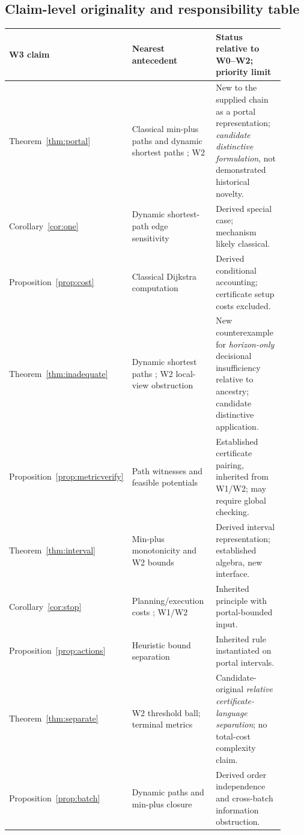 \documentclass[11pt,letterpaper]{article}
\begin{document}
\subsection*{Claim-level originality and responsibility table}
\small
\begin{longtable}{@{}p{0.22\linewidth}p{0.38\linewidth}p{0.31\linewidth}@{}}
\toprule
W3 claim & Nearest antecedent & Status relative to W0--W2; priority limit\\\midrule\endhead
Theorem~\ref{thm:portal} & Classical min-plus paths and dynamic shortest paths \cite{Mohri,Dynamic,Demetrescu}; W2 & New to the supplied chain as a portal representation; \emph{candidate distinctive formulation}, not demonstrated historical novelty.\\
Corollary~\ref{cor:one} & Dynamic shortest-path edge sensitivity \cite{Dynamic,Demetrescu} & Derived special case; mechanism likely classical.\\
Proposition~\ref{prop:cost} & Classical Dijkstra computation \cite{Dijkstra} & Derived conditional accounting; certificate setup costs excluded.\\
Theorem~\ref{thm:inadequate} & Dynamic shortest paths \cite{Dynamic}; W2 local-view obstruction & New counterexample for \emph{horizon-only} decisional insufficiency relative to ancestry; candidate distinctive application.\\
Proposition~\ref{prop:metricverify} & Path witnesses and feasible potentials \cite{Necula,Mugdan,W1} & Established certificate pairing, inherited from W1/W2; may require global checking.\\
Theorem~\ref{thm:interval} & Min-plus monotonicity \cite{Mohri} and W2 bounds & Derived interval representation; established algebra, new interface.\\
Corollary~\ref{cor:stop} & Planning/execution costs \cite{Shekhar,Russell}; W1/W2 & Inherited principle with portal-bounded input.\\
Proposition~\ref{prop:actions} & Heuristic bound separation \cite{Hart,W0,W2} & Inherited rule instantiated on portal intervals.\\
Theorem~\ref{thm:separate} & W2 threshold ball; terminal metrics \cite{Krauthgamer} & Candidate-original \emph{relative certificate-language separation}; no total-cost complexity claim.\\
Proposition~\ref{prop:batch} & Dynamic paths and min-plus closure \cite{Dynamic,Mohri} & Derived order independence and cross-batch information obstruction.\\\bottomrule
\end{longtable}
\normalsize
\end{document}
